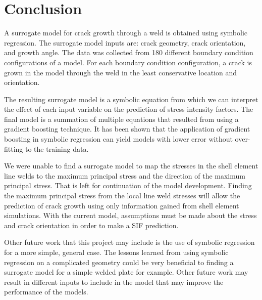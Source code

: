 
\chapter{Conclusion}\label{conclusion}

A surrogate model for crack growth through a weld is obtained using symbolic regression. The surrogate model inputs are: crack geometry, crack orientation, and growth angle. The data was collected from 180 different boundary condition configurations of a model. For each boundary condition configuration, a crack is grown in the model through the weld in the least conservative location and orientation. 

The resulting surrogate model is a symbolic equation from which we can interpret the effect of each input variable on the prediction of stress intensity factors. The final model is a summation of multiple equations that resulted from using a gradient boosting technique. It has been shown that the application of gradient boosting in symbolic regression can yield models with lower error without over-fitting to the training data. 

We were unable to find a surrogate model to map the stresses in the shell element line welds to the maximum principal stress and the direction of the maximum principal stress. That is left for continuation of the model development. Finding the maximum principal stress from the local line weld stresses will allow the prediction of crack growth using only information gained from shell element simulations. With the current model, assumptions must be made about the stress and crack orientation in order to make a SIF prediction.

Other future work that this project may include is the use of symbolic regression for a more simple, general case. The lessons learned from using symbolic regression on a complicated geometry could be very beneficial to finding a surrogate model for a simple welded plate for example. Other future work may result in different inputs to include in the model that may improve the performance of the models. 